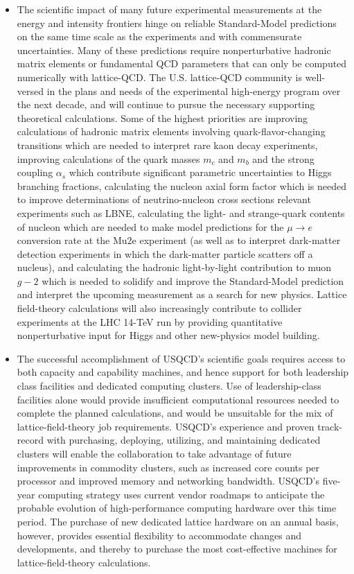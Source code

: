 \begin{itemize}

\item The scientific impact of many future experimental measurements at the
energy and intensity frontiers hinge on reliable Standard-Model predictions on
the same time scale as the experiments and with commensurate
uncertainties. Many of these predictions require nonperturbative hadronic
matrix elements or fundamental QCD parameters that can only be computed
numerically with lattice-QCD. The U.S. lattice-QCD community is well-versed in
the plans and needs of the experimental high-energy program over the next
decade, and will continue to pursue the necessary supporting theoretical
calculations.  Some of the highest priorities are improving calculations of
hadronic matrix elements involving quark-flavor-changing transitions which are
needed to interpret rare kaon decay experiments, improving calculations of the
quark masses $m_c$ and $m_b$ and the strong coupling $\alpha_s$ which
contribute significant parametric uncertainties to Higgs branching fractions,
calculating the nucleon axial form factor which is needed to improve
determinations of neutrino-nucleon cross sections relevant experiments such as
LBNE, calculating the light- and strange-quark contents of nucleon which are
needed to make model predictions for the $\mu \to e$ conversion rate at the
Mu2e experiment (as well as to interpret dark-matter detection experiments in
which the dark-matter particle scatters off a nucleus), and calculating the
hadronic light-by-light contribution to muon $g-2$ which is needed to solidify
and improve the Standard-Model prediction and interpret the upcoming
measurement as a search for new physics.  Lattice field-theory calculations
will also increasingly contribute to collider experiments at the LHC 14-TeV
run by providing quantitative nonperturbative input for Higgs and other
new-physics model building.

\item The successful accomplishment of USQCD's scientific goals requires
access to both capacity and capability machines, and hence support for both
leadership class facilities and dedicated computing clusters.  Use of
leadership-class facilities alone would provide insufficient computational
resources needed to complete the planned calculations, and would be unsuitable
for the mix of lattice-field-theory job requirements.  USQCD's experience and
proven track-record with purchasing, deploying, utilizing, and maintaining
dedicated clusters will enable the collaboration to take advantage of future
improvements in commodity clusters, such as increased core counts per
processor and improved memory and networking bandwidth.  USQCD's five-year
computing strategy uses current vendor roadmaps to anticipate the probable
evolution of high-performance computing hardware over this time period.  The
purchase of new dedicated lattice hardware on an annual basis, however,
provides essential flexibility to accommodate changes and developments, and
thereby to purchase the most cost-effective machines for lattice-field-theory
calculations.


\end{itemize}
